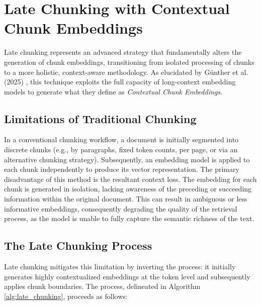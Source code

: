\section{Late Chunking with Contextual Chunk Embeddings}
Late chunking represents an advanced strategy that fundamentally alters the generation of chunk embeddings, transitioning from isolated processing of chunks to a more holistic, context-aware methodology. As elucidated by Günther et al. (2025) \autocite{günther2025latechunkingcontextualchunk}, this technique exploits the full capacity of long-context embedding models to generate what they define as \textit{Contextual Chunk Embeddings}.

\subsection{Limitations of Traditional Chunking}
In a conventional chunking workflow, a document is initially segmented into discrete chunks (e.g., by paragraphs, fixed token counts, per page, or via an alternative chunking strategy). Subsequently, an embedding model is applied to each chunk independently to produce its vector representation. The primary disadvantage of this method is the resultant context loss. The embedding for each chunk is generated in isolation, lacking awareness of the preceding or succeeding information within the original document. This can result in ambiguous or less informative embeddings, consequently degrading the quality of the retrieval process, as the model is unable to fully capture the semantic richness of the text.

\subsection{The Late Chunking Process}
Late chunking mitigates this limitation by inverting the process: it initially generates highly contextualized embeddings at the token level and subsequently applies chunk boundaries. The process, delineated in Algorithm \ref{alg:late_chunking}, proceeds as follows:

